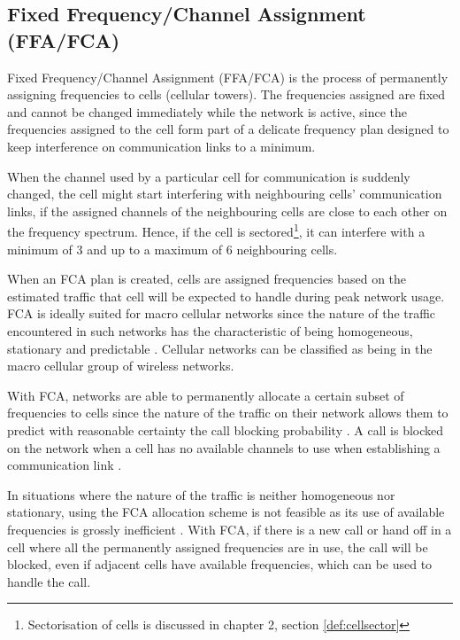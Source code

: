 \subsection{Fixed Frequency/Channel Assignment (FFA/FCA)}
Fixed Frequency/Channel Assignment (FFA/FCA) is the process of permanently assigning frequencies to cells (cellular towers). The frequencies assigned are fixed and cannot be changed immediately while the network is active, since the frequencies assigned to the cell form part of a delicate frequency plan designed to keep interference on communication links to a minimum\cite{PrinciplesMobileCommunication}. 

When the channel used by a particular cell for communication is suddenly changed, the cell might start interfering with neighbouring cells' communication links, if the assigned channels of the neighbouring cells are close to each other on the frequency spectrum. Hence, if the cell is sectored\footnote{Sectorisation of cells is discussed in chapter 2, section \ref{def:cellsector}}, it can interfere with a minimum of 3 and up to a maximum of 6 neighbouring cells\cite{PrinciplesMobileCommunication}.

When an FCA plan is created, cells are assigned frequencies based on the estimated traffic that cell will be expected to handle during peak network usage. FCA is ideally suited for macro cellular networks since the nature of the traffic encountered in such networks has the characteristic of being homogeneous, stationary and predictable \cite{PrinciplesMobileCommunication}. Cellular networks can be classified as being in the macro cellular group of wireless networks.

With FCA, networks are able to permanently allocate a certain subset of frequencies to cells since the nature of the traffic on their network allows them to predict with reasonable certainty the call blocking probability \cite{PrinciplesMobileCommunication}. A call is blocked on the network when a cell has no available channels to use when establishing a communication link \cite{PrinciplesMobileCommunication}.

In situations where the nature of the traffic is neither homogeneous nor stationary, using the FCA allocation scheme is not feasible as its use of available frequencies is grossly inefficient \cite{PrinciplesMobileCommunication}. With FCA, if there is a new call or hand off in a cell where all the permanently assigned frequencies are in use, the call will be blocked, even if adjacent cells have available frequencies, which can be used to handle the call\cite{PrinciplesMobileCommunication}.

